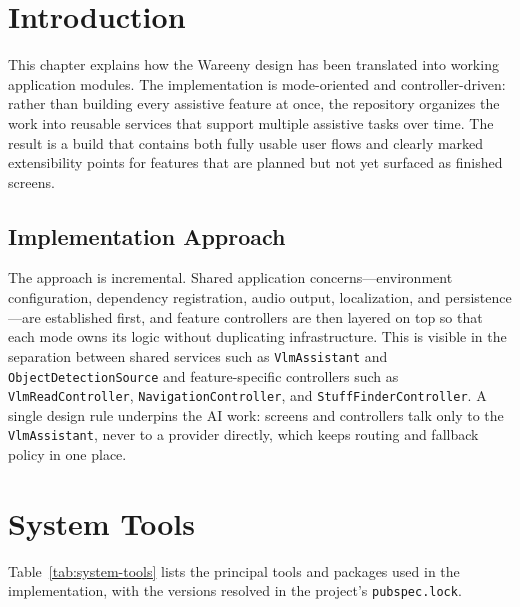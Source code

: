 \documentclass[a4paper]{report}
\begin{document}
\section{Introduction}
This chapter explains how the Wareeny design has been translated into working application modules. The implementation is mode-oriented and controller-driven: rather than building every assistive feature at once, the repository organizes the work into reusable services that support multiple assistive tasks over time. The result is a build that contains both fully usable user flows and clearly marked extensibility points for features that are planned but not yet surfaced as finished screens.

\subsection{Implementation Approach}
The approach is incremental. Shared application concerns---environment configuration, dependency registration, audio output, localization, and persistence---are established first, and feature controllers are then layered on top so that each mode owns its logic without duplicating infrastructure. This is visible in the separation between shared services such as \texttt{VlmAssistant} and \texttt{ObjectDetectionSource} and feature-specific controllers such as \texttt{VlmReadController}, \texttt{NavigationController}, and \texttt{StuffFinderController}. A single design rule underpins the AI work: screens and controllers talk only to the \texttt{VlmAssistant}, never to a provider directly, which keeps routing and fallback policy in one place.

\section{System Tools}
Table~\ref{tab:system-tools} lists the principal tools and packages used in the implementation, with the versions resolved in the project's \texttt{pubspec.lock}.
\end{document}
